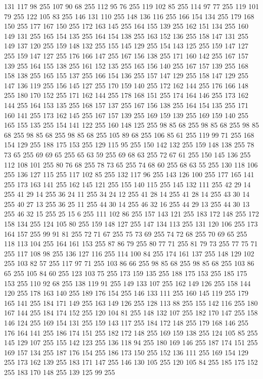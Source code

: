 131 117 98 255 107 90 68 255 112 95 76 255 119 102 85 255 114 97 77 255 119 101 79 255 122 105 83 255 146 131 110 255 148 136 116 255 166 154 134 255 179 168 150 255 177 167 150 255 172 163 145 255 164 155 139 255 162 151 134 255 160 149 131 255 165 154 135 255 164 154 138 255 163 152 136 255 158 147 131 255 149 137 120 255 159 148 132 255 155 145 129 255 154 143 125 255 159 147 127 255 159 147 127 255 176 166 147 255 167 156 138 255 171 160 142 255 167 157 139 255 164 155 138 255 161 152 135 255 165 156 140 255 167 157 139 255 168 158 138 255 165 155 137 255 166 154 136 255 157 147 129 255 158 147 129 255 147 136 119 255 156 145 127 255 170 159 140 255 172 162 144 255 176 166 148 255 180 170 152 255 171 162 144 255 178 168 151 255 174 164 146 255 173 162 144 255 164 153 135 255 168 157 137 255 167 156 138 255 164 154 135 255 171 160 141 255 173 162 145 255 167 157 139 255 169 159 139 255 169 159 140 255 165 155 135 255 154 141 122 255 160 148 125 255 98 85 68 255 98 85 68 255 98 85 68 255
98 85 68 255 98 85 68 255 105 89 68 255 106 85 61 255 119 99 71 255 168 154 129 255 188 175 153 255 129 115 95 255 150 142 132 255 159 148 138 255 78 73 65 255 69 69 65 255 65 63 59 255 69 68 63 255 72 67 61 255 150 145 136 255 112 108 101 255 80 76 68 255 78 73 65 255 74 68 60 255 68 63 55 255 130 118 106 255 136 127 115 255 117 102 85 255 132 117 96 255 143 126 100 255 177 165 141 255 173 163 141 255 162 145 121 255 155 140 115 255 145 132 111 255 42 29 14 255 41 29 14 255 36 24 11 255 34 24 12 255 41 28 14 255 41 28 14 255 43 30 14 255 40 27 13 255 36 25 11 255 44 30 14 255 46 32 16 255 44 29 13 255 44 30 13 255 46 32 15 255 25 15 6 255 111 102 86 255 157 143 121 255 183 172 148 255 172 158 134 255 124 105 80 255 159 148 127 255 147 134 113 255 131 120 106 255 173 164 157 255 99 91 81 255 72 71 67 255 75 73 69 255 74 72 68 255 70 69 65 255 118 113 104 255 164 161 153 255 87 86 79 255 80 77 71 255
81 79 73 255 77 75 71 255 117 108 98 255 136 127 116 255 114 100 84 255 174 161 137 255 148 129 102 255 103 82 57 255 117 97 71 255 103 86 66 255 98 85 68 255 98 85 68 255 103 86 65 255 105 84 60 255 123 103 75 255 173 159 135 255 188 175 153 255 185 175 153 255 110 92 68 255 138 119 91 255 149 133 107 255 162 149 126 255 158 144 120 255 178 163 140 255 189 176 154 255 146 133 111 255 160 145 119 255 179 165 141 255 184 171 149 255 163 149 126 255 128 113 88 255 155 142 116 255 180 167 144 255 184 174 152 255 120 104 81 255 148 132 107 255 182 170 147 255 158 146 124 255 169 154 131 255 159 143 117 255 184 172 148 255 179 168 146 255 176 164 141 255 186 174 151 255 182 172 148 255 169 159 138 255 124 105 85 255 145 129 107 255 155 142 123 255 136 118 94 255 180 169 146 255 187 174 151 255 169 157 134 255 187 176 154 255 186 173 150 255 152 136 111 255 169 154 129 255 173 162 139 255 183 171 147 255 146 130 105 255 120 105 84 255 185 175 152 255 183 170 148 255 139 125 99 255

